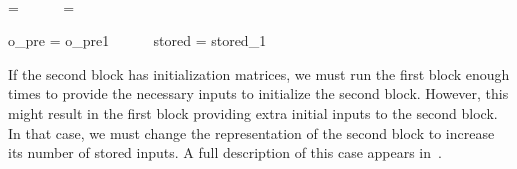 \begin{minipage}{3.3in}
~ \\ \vspace{-30pt}
\starteqnstar
{} =  ~~~~~
 = 
\doneeqnstar
~ \\ \vspace{-28pt}
\end{minipage}
\begin{minipage}[b]{2in}
\starteqnstar
o_{pre} = o_{pre1} ~~~~~
stored = stored_1
\doneeqnstar
\end{minipage}

If the second block has initialization matrices, we must run the first
block enough times to provide the necessary inputs to initialize the
second block. However, this might result in the first block providing
extra initial inputs to the second block. In that case, we must change
the representation of the second block to increase its number of
stored inputs.  A full description of this case appears
in~\cite{Agrawal04}.


